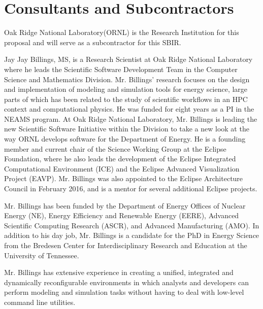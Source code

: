 \section{Consultants and Subcontractors}
Oak Ridge National Laboratory(ORNL) is the Research Institution for this proposal and will serve as a subcontractor for this SBIR. 

Jay Jay Billings, MS, is a Research Scientist at Oak Ridge National Laboratory where he leads the Scientific Software Development Team in the Computer Science and Mathematics Division.
Mr. Billings’ research focuses on the design and implementation of modeling and simulation tools for energy science, large parts of which has been related to the study of scientific workflows in an HPC context and computational physics. He was funded for eight years as a PI in the NEAMS program. At Oak Ridge National Laboratory, Mr. Billings is leading the new Scientific Software Initiative within the Division to take a new look at the way ORNL develops software for the Department of Energy. He is a founding member and current chair of the Science Working Group at the Eclipse Foundation, where he also leads the development of the Eclipse Integrated Computational Environment (ICE) and the Eclipse Advanced Visualization Project (EAVP). Mr. Billings was also appointed to the Eclipse Architecture Council in February 2016, and is a mentor for several additional Eclipse projects.

Mr. Billings has been funded by the Department of Energy Offices of Nuclear Energy (NE), Energy Efficiency and Renewable Energy (EERE), Advanced Scientific Computing Research (ASCR), and Advanced Manufacturing (AMO). In addition to his day job, Mr. Billings is a candidate for the PhD in Energy Science from the Bredesen Center for Interdisciplinary Research and Education at the University of Tennessee.%

Mr. Billings has extensive experience in creating a unified, integrated and dynamically reconfigurable environments in which analysts and developers can perform modeling and simulation tasks without having to deal with low-level command line utilities.
